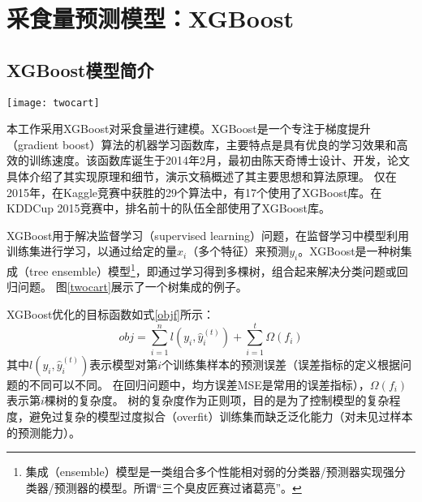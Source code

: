 \section{采食量预测模型：XGBoost}
\label{model}

\subsection{XGBoost模型简介}

\begin{figure*}
\begin{center}
	\texttt{[image: twocart]}
\caption{一个树集成的例子。该包含两棵树的模型解决分类问题，输入变量是每个人的年龄、性别、职业等特征，分类目标是“此人是否喜欢电脑游戏”。树集成将每棵树的输出结果组合起来（本例中为同权重地相加），例如小男孩分类结果为2.9，老爷爷分类结果为-1.9。如果我们设定模型分类阈值为0，则模型认为小男孩喜欢电脑游戏，老爷爷不喜欢。}
\label{twocart}
\end{center}
\end{figure*}


本工作采用XGBoost对采食量进行建模。XGBoost\cite{xgboost_github}是一个专注于梯度提升（gradient boost）算法的机器学习函数库，主要特点是具有优良的学习效果和高效的训练速度。该函数库诞生于2014年2月，最初由陈天奇博士设计、开发，论文\cite{Chen2016XGBoost}具体介绍了其实现原理和细节，演示文稿\cite{xgboost_slides}概述了其主要思想和算法原理。
仅在2015年，在Kaggle\cite{kaggle}竞赛中获胜的29个算法中，有17个使用了XGBoost库。在KDDCup 2015\cite{kddcup2015}竞赛中，排名前十的队伍全部使用了XGBoost库。

XGBoost用于解决监督学习（supervised learning）问题，在监督学习中模型利用训练集进行学习，以通过给定的量$x_i$（多个特征）来预测$y_i$。XGBoost是一种树集成（tree ensemble）模型\footnote{集成（ensemble）模型是一类组合多个性能相对弱的分类器/预测器实现强分类器/预测器的模型。所谓“三个臭皮匠赛过诸葛亮”。}，即通过学习得到多棵树，组合起来解决分类问题或回归问题。
图\ref{twocart}展示了一个树集成的例子。

XGBoost优化的目标函数如式\ref{objf}所示：
\begin{equation}
\label{objf}
	obj = \sum_{i=1}^n l(y_i, \hat y_i^{(t)}) + \sum_{i=1}^t \Omega(f_i)
\end{equation}
其中$l(y_i, \hat y_i^{(t)})$表示模型对第$i$个训练集样本的预测误差（误差指标的定义根据问题的不同可以不同。
在回归问题中，均方误差MSE是常用的误差指标），$\Omega(f_i)$表示第$i$棵树的复杂度。
树的复杂度作为正则项，目的是为了控制模型的复杂程度，避免过复杂的模型过度拟合（overfit）训练集而缺乏泛化能力（对未见过样本的预测能力）。

